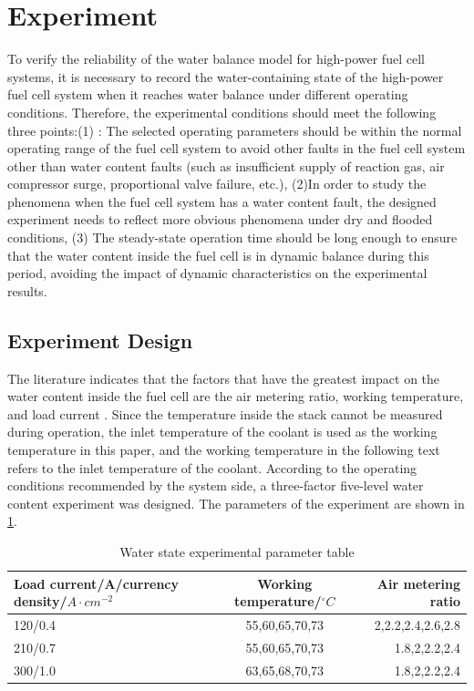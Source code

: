 \section{Experiment}
To verify the reliability of the water balance model for high-power fuel cell systems, it is necessary to record the water-containing state of the high-power fuel cell system when it reaches water balance under different operating conditions. Therefore, the experimental conditions should meet the following three points:(1) : The selected operating parameters should be within the normal operating range of the fuel cell system to avoid other faults in the fuel cell system other than water content faults (such as insufficient supply of reaction gas, air compressor surge, proportional valve failure, etc.), (2)In order to study the phenomena when the fuel cell system has a water content fault, the designed experiment needs to reflect more obvious phenomena under dry and flooded conditions, (3) The steady-state operation time should be long enough to ensure that the water content inside the fuel cell is in dynamic balance during this period, avoiding the impact of dynamic characteristics on the experimental results.
\subsection{Experiment Design}
The literature indicates that the factors that have the greatest impact on the water content inside the fuel cell are the air metering ratio, working temperature, and load current \cite{legrosFirstResultsPEMFC2011}. Since the temperature inside the stack cannot be measured during operation, the inlet temperature of the coolant is used as the working temperature in this paper, and the working temperature in the following text refers to the inlet temperature of the coolant. According to the operating conditions recommended by the system side, a three-factor five-level water content experiment was designed. The parameters of the experiment are shown in \ref{tab:WaterStateExperimentalParameterTable}.
\begin{table}
	\centering
	\begin{center}
		\caption{Water state experimental parameter table}
		\label{tab:WaterStateExperimentalParameterTable}
		\begin{tabular}{l|c|r}
			\hline
			\textbf{Load current/A/currency density/$A·cm^{-2}$} & \textbf{Working temperature/$^{\circ}C$} & \textbf{Air metering ratio} \\
			\hline
			120/0.4                                         & 55,60,65,70,73                 & 2,2.2,2.4,2.6,2.8           \\
			210/0.7                                         & 55,60,65,70,73                 & 1.8,2,2.2,2.4               \\
			300/1.0                                         & 63,65,68,70,73                 & 1.8,2,2.2,2.4               \\
			\hline
		\end{tabular}
	\end{center}
\end{table}

